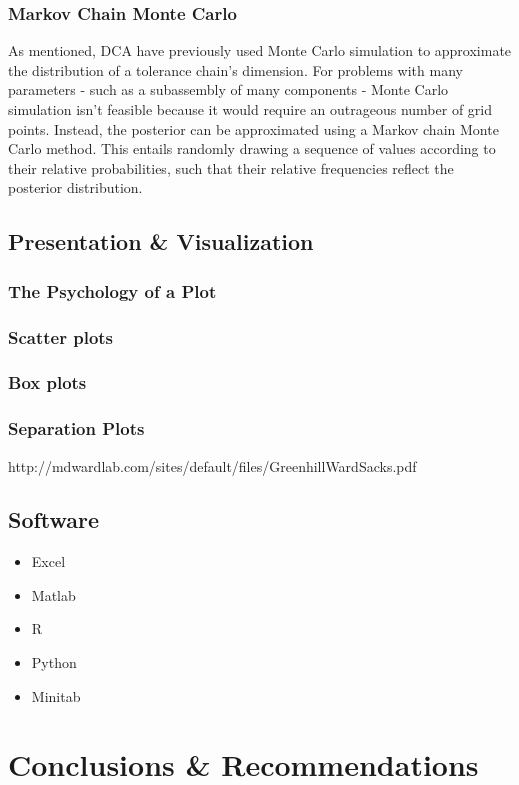 \documentclass[11pt,a4paper,article]{memoir} %
\begin{document}
\subsection*{Markov Chain Monte Carlo}
As mentioned, DCA have previously used Monte Carlo simulation to approximate the distribution of a tolerance chain's dimension. For problems with many parameters - such as a subassembly of many components - Monte Carlo simulation isn't feasible because it would require an outrageous number of grid points. Instead, the posterior can be approximated using a Markov chain Monte Carlo method. This entails randomly drawing a sequence of values according to their relative probabilities, such that their relative frequencies reflect the posterior distribution.

\section{Presentation \& Visualization}
\subsection{The Psychology of a Plot}
\subsection{Scatter plots}
\subsection{Box plots}
\subsection{Separation Plots}
http://mdwardlab.com/sites/default/files/GreenhillWardSacks.pdf

\section{Software}
\begin{itemize}
\item Excel
\item Matlab
\item R
\item Python
\item Minitab
\end{itemize}

\newpage


\chapter{Conclusions \& Recommendations}
\end{document}
